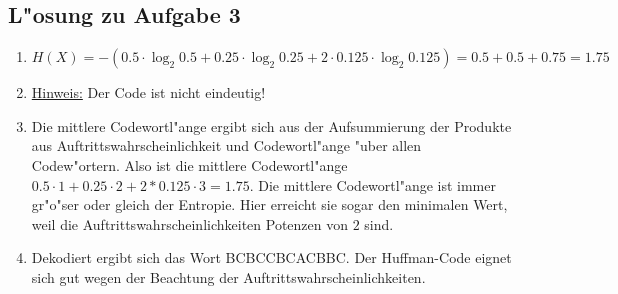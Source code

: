 \documentclass[10pt,oneside,onecolumn,a4paper,german,titlepage]{article}
\begin{document}
\subsection*{L"osung zu Aufgabe 3}
\begin{enumerate}
\item $H(X) = -(0.5 \cdot \log_2{0.5} + 0.25 \cdot \log_2{0.25} + 2 \cdot 0.125 \cdot
\log_2{0.125}) = 0.5 + 0.5 + 0.75 = 1.75$

\newpage

\item \underline{Hinweis:} Der Code ist nicht eindeutig!
\begin{center}
\end{center}
\item Die mittlere Codewortl"ange ergibt sich aus der Aufsummierung der Produkte aus
Auftrittswahrscheinlichkeit und Codewortl"ange "uber allen Codew"ortern. Also ist die
mittlere Codewortl"ange $0.5 \cdot 1 + 0.25 \cdot 2 + 2 * 0.125 \cdot 3 = 1.75$. Die
mittlere Codewortl"ange ist immer gr"o"ser oder gleich der Entropie. Hier erreicht
sie sogar den minimalen Wert, weil die Auftrittswahrscheinlichkeiten Potenzen von $2$
sind.
\item Dekodiert ergibt sich das Wort BCBCCBCACBBC. Der Huffman-Code eignet sich gut
wegen der Beachtung der Auftrittswahrscheinlichkeiten.
\end{enumerate}
\end{document}
